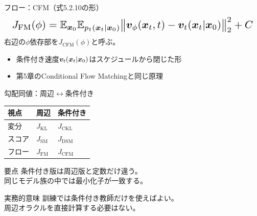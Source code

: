 \asmain
\begin{frame}{フロー：CFM（式5.2.10の形）}
    \[
        \resizebox{0.98\textwidth}{!}{$
        J_{\mathrm{FM}}(\phi)
        =
        \mathbb{E}_{\vx_0}
        \mathbb{E}_{p_t(\vx_t|\vx_0)}
        \bigl\|
        \bm{v}_\phi(\vx_t,t)
        -
        \bm{v}_t(\vx_t|\vx_0)
        \bigr\|_{2}^{2}
        +C
        $}
    \]
    右辺の$\phi$依存部を$J_{\mathrm{CFM}}(\phi)$と呼ぶ。
    \begin{itemize}
        \item 条件付き速度$\bm{v}_t(\bm{x}_t|\bm{x}_0)$はスケジュールから閉じた形
        \item 第5章のConditional Flow Matchingと同じ原理
    \end{itemize}
\end{frame}
\asmain
\begin{frame}{勾配同値：周辺$\leftrightarrow$条件付き}
    \renewcommand{\arraystretch}{1.2}
    \begin{tabular}{lll}
        \hline
        視点 & 周辺 & 条件付き \\
        \hline
        変分 & $J_{\mathrm{KL}}$ & $J_{\mathrm{CKL}}$ \\
        スコア & $J_{\mathrm{SM}}$ & $J_{\mathrm{DSM}}$ \\
        フロー & $J_{\mathrm{FM}}$ & $J_{\mathrm{CFM}}$ \\
        \hline
    \end{tabular}
    \vspace{0.5em}
    \begin{block}{要点}
        条件付き版は周辺版と定数だけ違う。\\
        同じモデル族の中では最小化子が一致する。
    \end{block}
    \begin{exampleblock}{実務的意味}
        訓練では条件付き教師だけを使えばよい。\\
        周辺オラクルを直接計算する必要はない。
    \end{exampleblock}
\end{frame}
